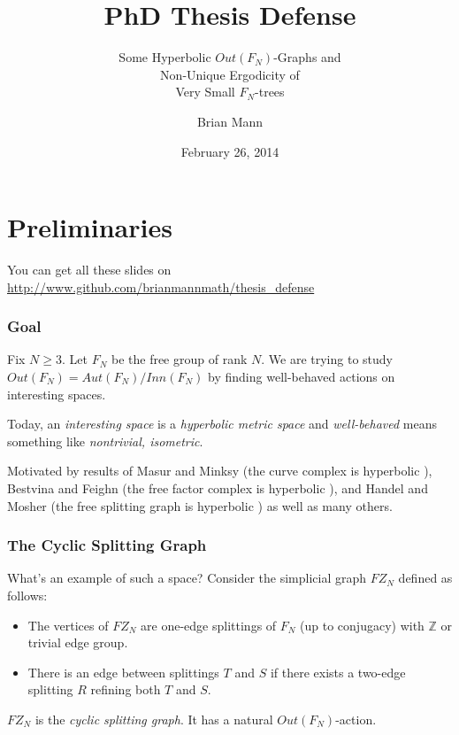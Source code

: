 \documentclass{beamer}
\title{PhD Thesis Defense}
\subtitle{Some Hyperbolic $Out(F_N)$-Graphs and\\ Non-Unique Ergodicity of\\ Very Small $F_N$-trees}
\author{Brian Mann}
\institute{University of Utah}
\date{February 26, 2014}
\theoremstyle{theorem}
\theoremstyle{definition}
\newcommand{\Z}{\ensuremath{\mathbb Z}}
\renewcommand{\-}{\ensuremath{^{-1}}}
\renewcommand{\>}{\ensuremath{\rightarrow}}
\renewcommand{\(}{\langle}
\renewcommand{\)}{\rangle}
\begin{document}
\begin{frame}
\titlepage
\end{frame}



\section{Preliminaries}

\begin{frame}
You can get all these slides on \url{http://www.github.com/brianmannmath/thesis_defense}
\end{frame}


\begin{frame}
\frametitle{Goal}
Fix $N \geq 3$. Let $F_N$ be the free group of rank $N$. We are trying to study $Out(F_N) = Aut(F_N)/Inn(F_N)$ by finding well-behaved actions on interesting spaces.

\vspace{1cm}

\pause

Today, an \emph{interesting space} is a \emph{hyperbolic metric space} and \emph{well-behaved} means something like \emph{nontrivial, isometric}.

\vspace{1cm} 
\pause

Motivated by results of Masur and Minksy (the curve complex is hyperbolic \cite{MasurMinsky}), Bestvina and Feighn (the free factor complex is hyperbolic \cite{BF11}), and Handel and Mosher (the free splitting graph is hyperbolic \cite{HandelMosher}) as well as many others.
\end{frame}



\begin{frame}
\frametitle{The Cyclic Splitting Graph}
What's an example of such a space? Consider the simplicial graph $FZ_N$ defined as follows:
\pause
\begin{itemize}
\item The vertices of $FZ_N$ are one-edge splittings of $F_N$ (up to conjugacy) with $\Z$ or trivial edge group.
\pause
\item There is an edge between splittings $T$ and $S$ if there exists a two-edge splitting $R$ refining both $T$ and $S$.
\end{itemize}

$FZ_N$ is the \emph{cyclic splitting graph}. It has a natural $Out(F_N)$-action.
\end{frame}
\end{document}
